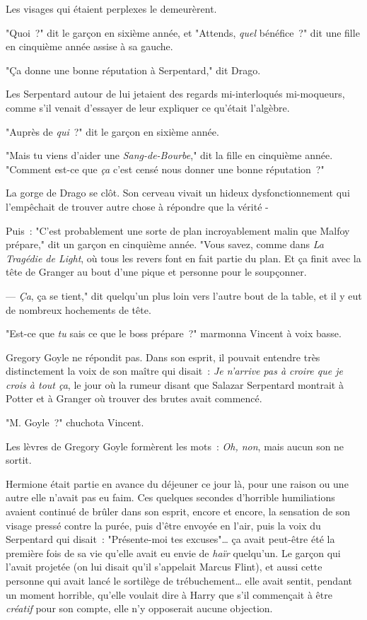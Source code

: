 Les visages qui étaient perplexes le demeurèrent.

"Quoi~?" dit le garçon en sixième année, et "Attends, \emph{quel} bénéfice~?" dit une fille en cinquième année assise à sa gauche.

"Ça donne une bonne réputation à Serpentard," dit Drago.

Les Serpentard autour de lui jetaient des regards mi-interloqués mi-moqueurs, comme s'il venait d'essayer de leur expliquer ce qu'était l'algèbre.

"Auprès de \emph{qui}~?" dit le garçon en sixième année.

"Mais tu viens d'aider une \emph{Sang-de-Bourbe}," dit la fille en cinquième année. "Comment est-ce que \emph{ça} c'est censé nous donner une bonne réputation~?"

La gorge de Drago se clôt. Son cerveau vivait un hideux dysfonctionnement qui l'empêchait de trouver autre chose à répondre que la vérité -

Puis~: "C'est probablement une sorte de plan incroyablement malin que Malfoy prépare," dit un garçon en cinquième année. "Vous savez, comme dans \emph{La Tragédie de Light}, où tous les revers font en fait partie du plan. Et ça finit avec la tête de Granger au bout d'une pique et personne pour le soupçonner.

--- \emph{Ça}, ça se tient," dit quelqu'un plus loin vers l'autre bout de la table, et il y eut de nombreux hochements de tête.

\later

"Est-ce que \emph{tu} sais ce que le boss prépare~?" marmonna Vincent à voix basse.

Gregory Goyle ne répondit pas. Dans son esprit, il pouvait entendre très distinctement la voix de son maître qui disait~: \emph{Je n'arrive pas à croire que je crois à tout ça}, le jour où la rumeur disant que Salazar Serpentard montrait à Potter et à Granger où trouver des brutes avait commencé.

"M. Goyle~?" chuchota Vincent.

Les lèvres de Gregory Goyle formèrent les mots~: \emph{Oh, non}, mais aucun son ne sortit.

\later

Hermione était partie en avance du déjeuner ce jour là, pour une raison ou une autre elle n'avait pas eu faim. Ces quelques secondes d'horrible humiliations avaient continué de brûler dans son esprit, encore et encore, la sensation de son visage pressé contre la purée, puis d'être envoyée en l'air, puis la voix du Serpentard qui disait~: "Présente-moi tes excuses"… ça avait peut-être été la première fois de sa vie qu'elle avait eu envie de \emph{haïr} quelqu'un. Le garçon qui l'avait projetée (on lui disait qu'il s'appelait Marcus Flint), et aussi cette personne qui avait lancé le sortilège de trébuchement… elle avait sentit, pendant un moment horrible, qu'elle voulait dire à Harry que s'il commençait à être \emph{créatif} pour son compte, elle n'y opposerait aucune objection.

